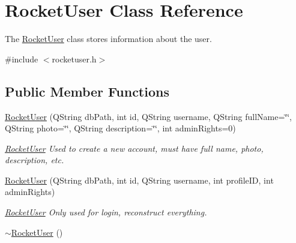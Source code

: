 \hypertarget{classRocketUser}{}\section{Rocket\+User Class Reference}
\label{classRocketUser}


The \hyperlink{classRocketUser}{Rocket\+User} class stores information about the user.  




{\ttfamily \#include $<$rocketuser.\+h$>$}

\subsection*{Public Member Functions}
\begin{DoxyCompactItemize}
\item 
\hyperlink{classRocketUser_a57af92433b5c5e739a5c9cef7f238c4e}{Rocket\+User} (Q\+String db\+Path, int id, Q\+String username, Q\+String full\+Name=\char`\"{}\char`\"{}, Q\+String photo=\char`\"{}\char`\"{}, Q\+String description=\char`\"{}\char`\"{}, int admin\+Rights=0)
\begin{DoxyCompactList}\small\item\em \hyperlink{classRocketUser}{Rocket\+User} Used to create a new account, must have full name, photo, description, etc. \end{DoxyCompactList}\item 
\hyperlink{classRocketUser_aee17bbc4be7b88149c3fc008b636e831}{Rocket\+User} (Q\+String db\+Path, int id, Q\+String username, int profile\+ID, int admin\+Rights)
\begin{DoxyCompactList}\small\item\em \hyperlink{classRocketUser}{Rocket\+User} Only used for login, reconstruct everything. \end{DoxyCompactList}\item 
\hyperlink{classRocketUser_a1922172eefb653c80d641929e6bdf669}{$\sim$\+Rocket\+User} ()\hypertarget{classRocketUser_a1922172eefb653c80d641929e6bdf669}{}\label{classRocketUser_a1922172eefb653c80d641929e6bdf669}


\end{DoxyCompactItemize}
